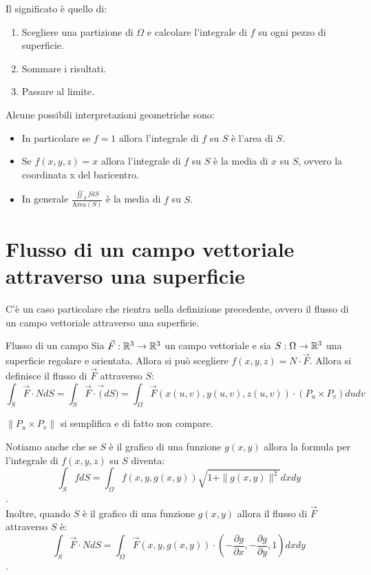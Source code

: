Il significato è quello di:
\begin{enumerate}
  \item Scegliere una partizione di $\Omega$ e calcolare l'integrale di $f$ su ogni pezzo di superficie.
  \item Sommare i risultati.
  \item Passare al limite.
\end{enumerate}
Alcune possibili interpretazioni geometriche sono:
\begin{itemize}
\item In particolare se $f=1$ allora l'integrale di $f$ su $S$ è l'area di $S$.\\
\item Se $f(x,y,z)=x$ allora l'integrale di $f$ su $S$ è la media di $x$ su $S$, ovvero la coordinata x del baricentro.\\
\item In generale $\frac{\iint_S f dS}{\text{Area}(S)}$ è la media di $f$ su $S$.\\
\end{itemize}

\section{Flusso di un campo vettoriale attraverso una superficie}
C'è un caso particolare che rientra nella definizione precedente, ovvero il flusso di un campo vettoriale attraverso una superficie.\\
\begin{definizione}{Flusso di un campo}
  Sia $\vec F:\mathbb{R}^3\to\mathbb{R}^3$ un campo vettoriale e sia $S:\Omega\to\mathbb{R}^3$ una superficie regolare e orientata. Allora si può scegliere $f(x,y,z)=N\cdot \vec F$. Allora si definisce il flusso di $\vec F$ attraverso $S$:
  $$\int_{S} \vec F \cdot N d S = \int_{S} \vec F \cdot \vec (dS) = \int_{\Omega} \vec F(x(u,v),y(u,v),z(u,v))\cdot (P_u\times P_v)dudv$$
\end{definizione}
\begin{osservazione}{}
  $\|P_u \times P_v\|$ si semplifica e di fatto non compare.
\end{osservazione}

Notiamo anche che se $S$ è il grafico di una funzione $g(x,y)$ allora la formula per l'integrale di $f(x,y,z)$ su $S$ diventa:
$$\int_{S} f dS = \int_{\Omega} f(x,y,g(x,y))\sqrt{1+\|g(x,y)\|^2}dxdy$$.\\
Inoltre, quando $S$ è il grafico di una funzione $g(x,y)$ allora il flusso di $\vec F$ attraverso $S$ è:
$$\int_{S} \vec F \cdot N d S = \int_{\Omega} \vec F(x,y,g(x,y))\cdot \left(-\frac{\partial g}{\partial x},-\frac{\partial g}{\partial y},1\right)dxdy$$.\\
